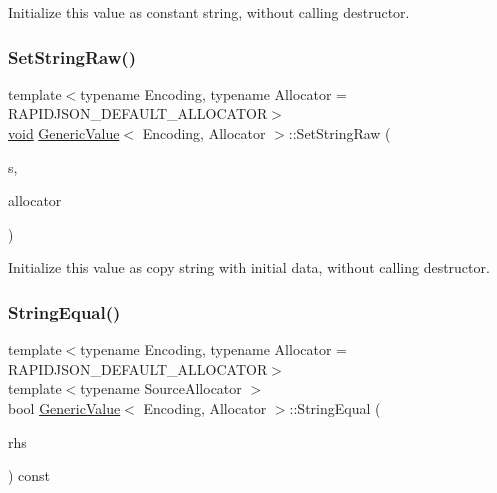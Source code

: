 Initialize this value as constant string, without calling destructor. 

\mbox{\label{classGenericValue_ad3d91db36dfdbfc1af40a79aae07723c}} 
\subsubsection{\texorpdfstring{Set\+String\+Raw()}{SetStringRaw()}\hspace{0.1cm}{\footnotesize\ttfamily [2/2]}}
{\footnotesize\ttfamily template$<$typename Encoding, typename Allocator = R\+A\+P\+I\+D\+J\+S\+O\+N\+\_\+\+D\+E\+F\+A\+U\+L\+T\+\_\+\+A\+L\+L\+O\+C\+A\+T\+OR$>$ \\
\hyperlink{imgui__impl__opengl3__loader_8h_ac668e7cffd9e2e9cfee428b9b2f34fa7}{void} \hyperlink{classGenericValue}{Generic\+Value}$<$ Encoding, Allocator $>$\+::Set\+String\+Raw (\begin{DoxyParamCaption}\item[{\hyperlink{classGenericValue_a32e0f30ee278072374c8168b14d3317f}{String\+Ref\+Type}}]{s,  }\item[{Allocator \&}]{allocator }\end{DoxyParamCaption})\hspace{0.3cm}{\ttfamily [inline]}}



Initialize this value as copy string with initial data, without calling destructor. 

\mbox{\label{classGenericValue_ad4d088dc601d99fea9d16300a7ec7ee1}} 
\subsubsection{\texorpdfstring{String\+Equal()}{StringEqual()}}
{\footnotesize\ttfamily template$<$typename Encoding, typename Allocator = R\+A\+P\+I\+D\+J\+S\+O\+N\+\_\+\+D\+E\+F\+A\+U\+L\+T\+\_\+\+A\+L\+L\+O\+C\+A\+T\+OR$>$ \\
template$<$typename Source\+Allocator $>$ \\
bool \hyperlink{classGenericValue}{Generic\+Value}$<$ Encoding, Allocator $>$\+::String\+Equal (\begin{DoxyParamCaption}\item[{const \hyperlink{classGenericValue}{Generic\+Value}$<$ Encoding, Source\+Allocator $>$ \&}]{rhs }\end{DoxyParamCaption}) const\hspace{0.3cm}{\ttfamily [inline]}}



